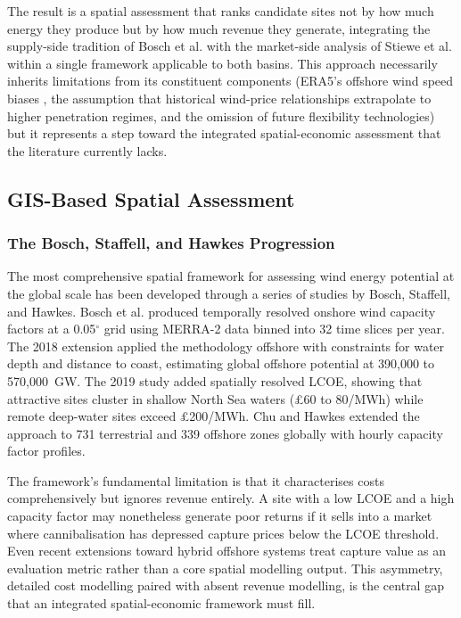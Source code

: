 \vspace{4pt}

The result is a spatial assessment that ranks candidate sites not by how much energy they produce but by how much revenue they generate, integrating the supply-side tradition of Bosch et al. \cite{Bosch2017, Bosch2018, Bosch2019} with the market-side analysis of Stiewe et al. \cite{Stiewe2025} within a single framework applicable to both basins. This approach necessarily inherits limitations from its constituent components (ERA5's offshore wind speed biases \cite{Gandoin2024}, the assumption that historical wind-price relationships extrapolate to higher penetration regimes, and the omission of future flexibility technologies) but it represents a step toward the integrated spatial-economic assessment that the literature currently lacks.

\subsection{GIS-Based Spatial Assessment}\label{sec:gis_assessment}

\subsubsection{The Bosch, Staffell, and Hawkes Progression}\label{sec:bosch_progression}

The most comprehensive spatial framework for assessing wind energy potential at the global scale has been developed through a series of studies by Bosch, Staffell, and Hawkes. Bosch et al. \cite{Bosch2017} produced temporally resolved onshore wind capacity factors at a 0.05$^{\circ}$ grid using MERRA-2 data binned into 32 time slices per year. The 2018 extension \cite{Bosch2018} applied the methodology offshore with constraints for water depth and distance to coast, estimating global offshore potential at 390,000 to 570,000~GW. The 2019 study \cite{Bosch2019} added spatially resolved LCOE, showing that attractive sites cluster in shallow North Sea waters (\pounds60 to 80/MWh) while remote deep-water sites exceed \pounds200/MWh. Chu and Hawkes \cite{Chu2020} extended the approach to 731 terrestrial and 339 offshore zones globally with hourly capacity factor profiles.

\vspace{4pt}

The framework's fundamental limitation is that it characterises costs comprehensively but ignores revenue entirely. A site with a low LCOE and a high capacity factor may nonetheless generate poor returns if it sells into a market where cannibalisation has depressed capture prices below the LCOE threshold. Even recent extensions toward hybrid offshore systems \cite{OffshoreHybrids2024} treat capture value as an evaluation metric rather than a core spatial modelling output. This asymmetry, detailed cost modelling paired with absent revenue modelling, is the central gap that an integrated spatial-economic framework must fill.
